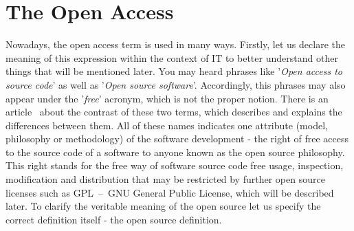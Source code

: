 \documentclass[11pt,a4paper]{article}
\theoremstyle{definition}
\begin{document}
\section{The Open Access}

    Nowadays, the open access term is used in many ways. Firstly, let us declare the meaning of this expression within the context of IT to better understand other things that will be mentioned later. You may heard phrases like '\textit{Open access to source code}' as well as '\textit{Open source software}'. Accordingly, this phrases may also appear under the '\textit{free}' acronym, which is not the proper notion. There is an article~\cite{WP:free-vs-open-source} about the contrast of these two terms, which describes and explains the differences between them. All of these names indicates one attribute (model, philosophy or methodology) of the software development - the right of free access to the source code of a software to anyone known as the open source philosophy. This right stands for the free way of software source code free usage, inspection, modification and distribution that may be restricted by further open source licenses such as GPL~--~GNU General Public License, which will be described later. To clarify the veritable meaning of the open source let us specify the correct definition itself - the open source definition.\\[-3mm]
\end{document}
